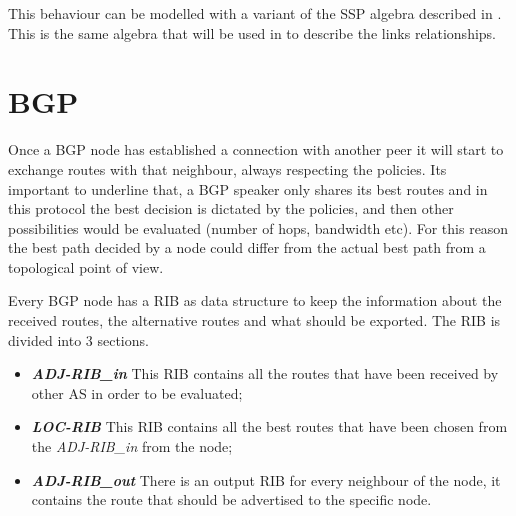 This behaviour can be modelled with a variant of the \ac{SSP} algebra described
in \cite{daggitt2018rate}.
This is the same algebra that will be used in  to describe the links
relationships.


\section{BGP}
\label{sec:bgp_intro}

Once a \ac{BGP} node has established a connection with another peer it will
start to exchange routes with that neighbour, always respecting the policies.
Its important to underline that, a \ac{BGP} speaker only shares its best routes
and in this protocol the best decision is dictated by the policies, and
then other possibilities would be evaluated (number of hops, bandwidth etc).
For this reason the best path decided by a node could differ from the actual
best path from a topological point of view.

Every \ac{BGP} node has a \ac{RIB} as data structure to keep the information
about the received routes, the alternative routes and what should be exported.
The \ac{RIB} is divided into \num{3} sections.
\begin{itemize}
	\item \textbf{\textit{ADJ-RIB\_in}} This \ac{RIB} contains all the routes
		that have been received by other \ac{AS} in order to be evaluated;
	\item \textbf{\textit{LOC-RIB}} This \ac{RIB} contains all the best routes
		that have been chosen from the \textit{ADJ-RIB\_in} from the node;
	\item \textbf{\textit{ADJ-RIB\_out}} There is an output \ac{RIB} for every
		neighbour of the node, it contains the route that should be advertised
		to the specific node.
\end{itemize}

